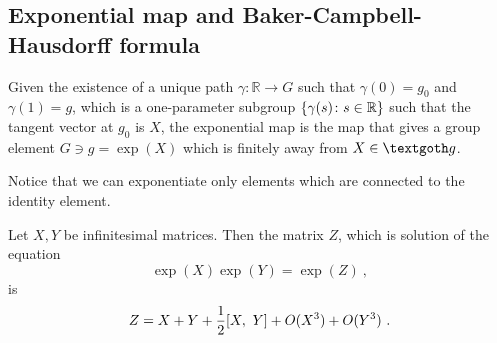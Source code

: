 \subsection{Exponential map and Baker-Campbell-Hausdorff formula}

    \begin{definition}
        Given the existence of a unique path $\gamma \colon \mathbb R \rightarrow G$ such that $\gamma(0) = g_0$ and $\gamma(1) = g$, which is a one-parameter subgroup $\{\gamma(s)\colon s \in \mathbb R\}$ such that the tangent vector at $g_0$ is $X$, the exponential map is the map that gives a group element $G \ni g = \exp(X)$ which is finitely away from $X \in \textgoth g$.
    \end{definition}
    \noindent Notice that we can exponentiate only elements which are connected to the identity element. 

    \begin{theorem}
        Let $X, Y$ be infinitesimal matrices. Then the matrix $Z$, which is solution of the equation 
    \begin{equation} \label{eq}
        \exp(X)\exp(Y) = \exp(Z) ~,
    \end{equation}
        is 
    \begin{equation}\label{bch}
        Z = X + Y + \frac{1}{2} [X,~Y] + O(X^3) + O(Y^3) ~.
    \end{equation}
    \end{theorem}


